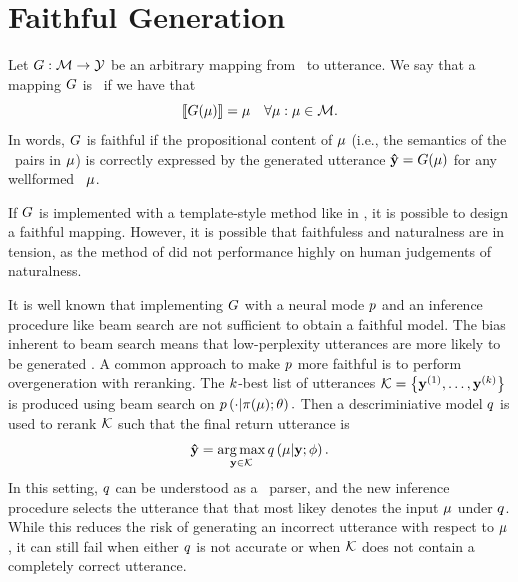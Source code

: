 \section{Faithful Generation}
\label{sec:nlgfg}


Let $G : \mathcal{M} \rightarrow \mathcal{Y}$ be an arbitrary mapping from 
\meaningrepresentation~to utterance. We say that a mapping $G$ is 
\faithful~if we have that \[\left\llbracket G(\mu) \right\rrbracket = \mu \quad \forall \mu: \mu \in \mathcal{M}.\] In words,
$G$ is faithful if the propositional content of $\mu$ (i.e., the semantics
of the \attributevalue~pairs in $\mu$) is correctly expressed by the 
generated utterance $\boldsymbol{\hat{\mathbf{y}}} = G(\mu)$ for any wellformed \meaningrepresentation~$\mu$. 

If $G$ is implemented with a template-style method like in \citet{e2etmepl},
it is possible to design a faithful mapping. However, it is possible that 
faithfuless and naturalness are in tension, as the method of \citet{e2etempl}
did not performance highly on human judgements of naturalness.

It is well known that implementing $G$ with a neural mode $p$ and 
an inference procedure like beam search are not sufficient to obtain a faithful
model.  The bias inherent to beam search means that 
low-perplexity utterances are 
more likely to be generated \cite{beamsucks}. 
 A common approach to make $p$ more faithful is to perform overgeneration 
 with
reranking. 
The $k$-best list of utterances $\mathcal{K} = \left\{\mathbf{y}^{(1)},\ldots,
\mathbf{y}^{(k)}\right\}$ is produced using beam search on $p\left(\cdot|\pi(\mu);\theta \right).$
Then 
a descriminiative model $q$ is used to rerank $\mathcal{K}$ such
that the final return utterance is \[
\boldsymbol{\hat{\mathbf{y}}} = \operatorname*{arg\,max}_{\mathbf{y} \in \mathcal{K}} q\left(\mu\vert\mathbf{y};\phi\right). \]
In this setting, $q$ can be understood as a 
\meaningrepresentation~parser, and the new inference procedure selects the 
utterance that 
that most likey denotes the input $\mu$ under $q$. While this reduces the risk of
generating an incorrect utterance with respect to $\mu$, it can still fail
when either $q$ is not accurate or when $\mathcal{K}$ does not contain
a completely correct utterance.

